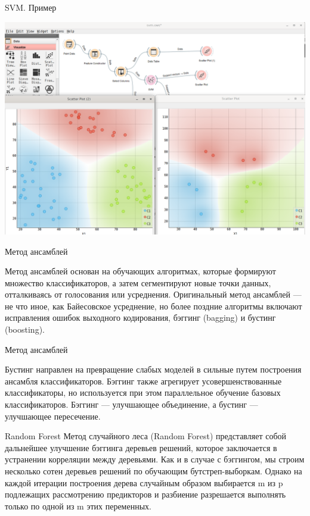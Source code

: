 \documentclass{beamer}
\begin{document}
\begin{frame}{SVM. Пример}


\includegraphics[scale=0.2]{task09_01.png}

\end{frame}

\begin{frame}{Метод ансамблей}

Метод ансамблей основан на обучающих алгоритмах, которые формируют множество классификаторов, а затем сегментируют 
новые точки данных, отталкиваясь от голосования или усреднения. 
Оригинальный метод ансамблей — не что иное, как Байесовское усреднение, но более поздние алгоритмы включают исправления ошибок выходного кодирования, бэггинг (bagging) и бустинг (boosting). 
\end{frame}


\begin{frame}{Метод ансамблей}

Бустинг направлен на превращение слабых моделей в сильные путем построения ансамбля классификаторов. 
Бэггинг также агрегирует усовершенствованные классификаторы, но используется при этом параллельное обучение 
базовых классификаторов. Бэггинг — улучшающее объединение, а бустинг — улучшающее пересечение.
\end{frame}


\begin{frame}{Random Forest}
Метод случайного леса (Random Forest) представляет собой дальнейшее улучшение бэггинга деревьев решений, 
которое заключается в устранении корреляции между деревьями. Как и в случае с бэггингом,
 мы строим несколько сотен деревьев решений по обучающим бутстреп-выборкам. 
 Однако на каждой итерации построения дерева случайным образом выбирается m из p подлежащих рассмотрению предикторов и разбиение разрешается выполнять только по одной из m этих переменных.
\end{frame}
\end{document}
